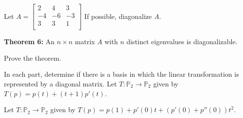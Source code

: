 \documentclass[12pt,letterpaper]{article}
\begin{document}
\begin{enumerate}

\Problem Let $A=\begin{bmatrix} 
2 & 4 & 3\\
-4 & -6 & -3\\
3 & 3 & 1\\
\end{bmatrix}$ If possible, diagonalize $A$.


\vfill
\vfill

{\bf Theorem 6:} An $n \times n$ matrix $A$ with $n$ distinct eigenvalues is diagonalizable.

\Problem Prove the theorem.

\vfill

\newpage

\Problem In each part, determine if there is a basis in which the linear transformation is represented by a diagonal matrix.
\Part Let $T: \mathbb{P}_2 \to \mathbb{P}_2$ given by $T(p)= p(t) +(t+1)p'(t)$.

\vfill

\Part Let $T: \mathbb{P}_2 \to \mathbb{P}_2$ given by $T(p) = p(1)+p'(0) t + (p'(0)+p''(0))t^2.$

\vfill




\end{enumerate}
\end{document}
